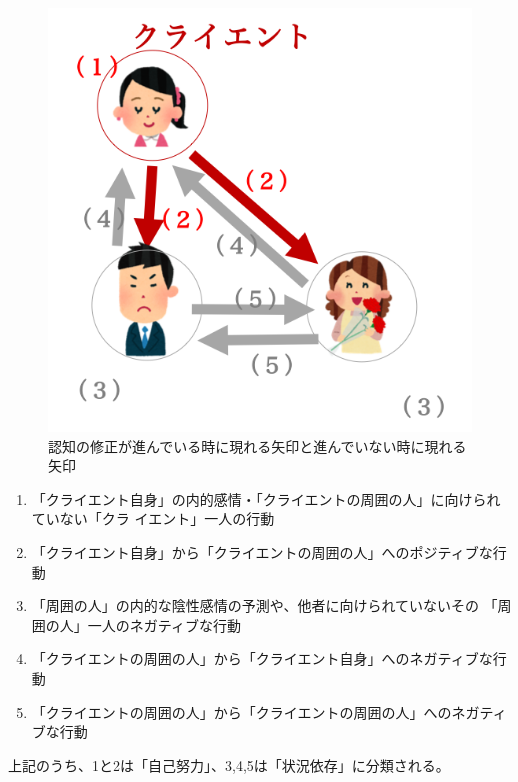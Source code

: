\documentclass[shuuron]{kuee}
\begin{document}
\begin{figure}
   \begin{center}
     \includegraphics[width=\linewidth]{arrow.png}
   \end{center}
   \caption{認知の修正が進んでいる時に現れる矢印と進んでいない時に現れる矢印}
   \label{fig:arrow}
 \end{figure}

 \begin{enumerate}
   \item 「クライエント自身」の内的感情・「クライエントの周囲の人」に向けられていない「クラ
   イエント」一人の行動
   \item 「クライエント自身」から「クライエントの周囲の人」へのポジティブな行動


   \item 「周囲の人」の内的な陰性感情の予測や、他者に向けられていないその
   「周囲の人」一人のネガティブな行動
   \item 「クライエントの周囲の人」から「クライエント自身」へのネガティブな行動
   \item 「クライエントの周囲の人」から「クライエントの周囲の人」へのネガティブな行動

 \end{enumerate}
  上記のうち、1と2は「自己努力」、3,4,5は「状況依存」に分類される。
\end{document}
